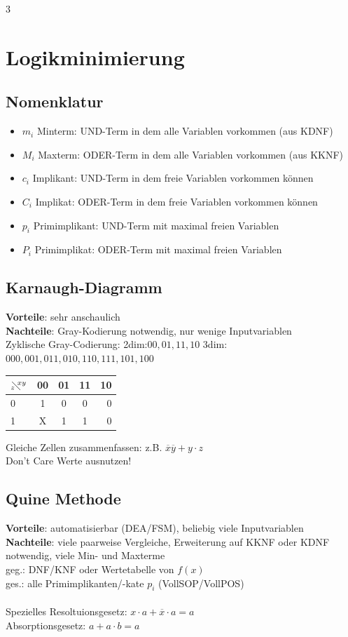 \documentclass[6pt,a4paper]{scrartcl}
\begin{document}
\begin{multicols*}{3}
\section{Logikminimierung}
	\subsection{Nomenklatur}
	\begin{itemize}\itemsep0pt
	\item $m_i$ Minterm: UND-Term in dem alle Variablen vorkommen (aus KDNF)
	\item $M_i$ Maxterm: ODER-Term in dem alle Variablen vorkommen (aus KKNF)
	\item $c_i$ Implikant: UND-Term in dem freie Variablen vorkommen können
	\item $C_i$ Implikat: ODER-Term in dem freie Variablen vorkommen können
	\item $p_i$ Primimplikant: UND-Term mit maximal freien Variablen
	\item $P_i$ Primimplikat: ODER-Term mit maximal freien Variablen
	\end{itemize}

	\subsection{Karnaugh-Diagramm} %
	\textbf{Vorteile}: sehr anschaulich\\
	\textbf{Nachteile}: Gray-Kodierung notwendig, nur wenige Inputvariablen\\
		Zyklische Gray-Codierung: 2dim:$00,01,11,10$ 3dim:$000,001,011,010,110,111,101,100$
		
	\begin{tabular}{l | c | c |  c | r}
	$_z\!\!\diagdown \!\!^{xy}$ & 00 	& 	01	&	11 	&	10	 	\\ \midrule
	0		&	1 \cellcolor{gray}	&	0	&	0	&	0		\\	
	1		&	X \cellcolor{gray}	&	1 \cellcolor{lightgray}	&	1 \cellcolor{lightgray}	&	0		\\	
	\end{tabular}
	Gleiche Zellen zusammenfassen: z.B. $\overline x \overline y + y \cdot z$\\
	Don't Care Werte ausnutzen!

	\subsection{Quine Methode}
	\textbf{Vorteile}: automatisierbar (DEA/FSM), beliebig viele Inputvariablen\\
	\textbf{Nachteile}: viele paarweise Vergleiche, Erweiterung auf KKNF oder KDNF notwendig, viele Min- und Maxterme\\
	geg.: DNF/KNF oder Wertetabelle von $f(x)$ \\
	ges.: alle Primimplikanten/-kate $p_i$ (VollSOP/VollPOS)  \\ \\
	Spezielles Resoltuionsgesetz: $x\cdot a + \overline x \cdot a = a$ \\
	Absorptionsgesetz: $a + a\cdot b = a$
	

\end{multicols*}
\end{document}
